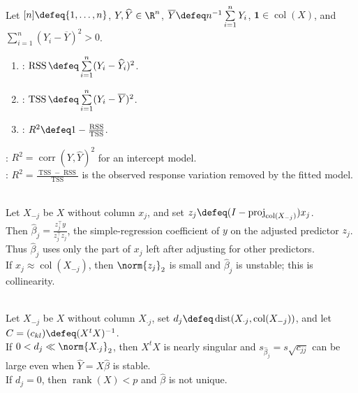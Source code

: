 \begin{definition} \label{def:coefficient-of-determination-r-squared} \\
Let $[n]\defeq\{1,\ldots,n\}$, $Y,\widehat{Y}\in\R^n$, $\overline{Y}\defeq n^{-1}\sum\limits_{i=1}^{n}Y_i$, $\mathbf{1}\in\operatorname{col}(X)$, and $\sum\limits_{i=1}^{n}(Y_i-\overline{Y})^2>0$.
\begin{enumerate}[label=(\roman*)]
\setlength{\itemsep}{0pt}
\item {}: $\operatorname{RSS}\defeq\sum\limits_{i=1}^{n}(Y_i-\widehat{Y}_i)^2$.
\item {}: $\operatorname{TSS}\defeq\sum\limits_{i=1}^{n}(Y_i-\overline{Y})^2$.
\item {}: $R^2\defeq1-\frac{\operatorname{RSS}}{\operatorname{TSS}}$.
\end{enumerate}
: $R^2=\operatorname{corr}(Y,\widehat{Y})^2$ for an intercept model.\\
: $R^2=\frac{\operatorname{TSS}-\operatorname{RSS}}{\operatorname{TSS}}$ is the observed response variation removed by the fitted model.
\end{definition}

\begin{remark} \label{rem:sl-adjusted-coefficient-interpretation} \\
Let $X_{-j}$ be $X$ without column $x_j$, and set $z_j\defeq(I-\operatorname{proj}_{\operatorname{col}(X_{-j})})x_j$.\\
Then $\widehat{\beta}_j=\frac{z_j^\top y}{z_j^\top z_j}$, the simple-regression coefficient of $y$ on the adjusted predictor $z_j$.\\
Thus $\widehat{\beta}_j$ uses only the part of $x_j$ left after adjusting for other predictors.\\
If $x_j\approx\operatorname{col}(X_{-j})$, then $\norm{z_j}_2$ is small and $\widehat{\beta}_j$ is unstable; this is collinearity.
\end{remark}

\begin{remark} \label{rem:collinearity-and-coefficient-interpretation} \\
Let $X_{-j}$ be $X$ without column $X_{\cdot j}$, set $d_j\defeq\operatorname{dist}(X_{\cdot j},\operatorname{col}(X_{-j}))$, and let $C=(c_{kl})\defeq(X^tX)^{-1}$.\\
If $0<d_j\ll\norm{X_{\cdot j}}_2$, then $X^tX$ is nearly singular and $s_{\widehat{\beta}_j}=s\sqrt{c_{jj}}$ can be large even when $\widehat{Y}=X\widehat{\beta}$ is stable.\\
If $d_j=0$, then $\operatorname{rank}(X)<p$ and $\widehat{\beta}$ is not unique.
\end{remark}

